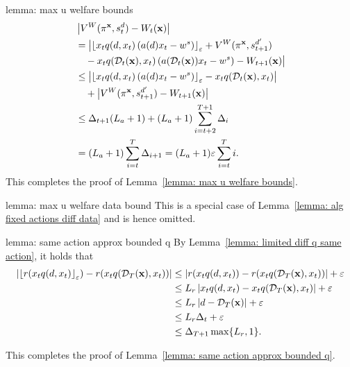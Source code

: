 \begin{proofof}{lemma: max u welfare bounds}
\begin{align*}
&\left| V^W(\pi^{{\bf{x}}}, s_t^d) - W_t({\bf{x}}) \right| \\
&= \big| {\left\lfloor x_t q(d, x_t) \left(a(d) x_t - w^s \right)\right\rfloor_{\varepsilon}} + V^W(\pi^{{\bf{x}}}, s_{t+1}^{d'}) \\
&\quad - x_t q(\mathcal{D}_t({\bf{x}}), x_t) \left( a(\mathcal{D}_t({\bf{x}})) x_t - w^s \right) - W_{t+1}({\bf{x}}) \big| \\
&\leq \big| {\left\lfloor x_t q(d, x_t) \left(a(d) x_t - w^s \right)\right\rfloor_{\varepsilon}} - x_t q(\mathcal{D}_t({\bf{x}}), x_t) \big| \\
&\quad + \big| V^W(\pi^{{\bf{x}}}, s_{t+1}^{d'}) - W_{t+1}({\bf{x}}) \big| \\
&\leq \Delta_{t+1} (L_a+1) + (L_a+1)\sum_{i = t+2}^{T+1} \Delta_i \\
&= (L_a+1) \sum_{i = t}^T \Delta_{i+1} = (L_a+1) \varepsilon \sum_{i = t}^T i.
\end{align*}
This completes the proof of Lemma~\ref{lemma: max u welfare bounds}.
\end{proofof}





\begin{proofof}{lemma: max u welfare data bound}
This is a special case of Lemma~\ref{lemma: alg fixed actions diff data} and is hence omitted.
\end{proofof}


\begin{proofof}{lemma: same action approx bounded q}
By Lemma~\ref{lemma: limited diff q same action}, it holds that
\begin{align*}
\left| {\left\lfloor r(x_t q(d, x_t)\right\rfloor_{\varepsilon}}) - r(x_t q(\mathcal{D}_T({\bf{x}}), x_t)) \right| &\leq \left| r(x_t q(d, x_t)) - r(x_t q(\mathcal{D}_T({\bf{x}}), x_t)) \right| + \varepsilon \\ 
& \leq L_r \left| x_t q(d, x_t) - x_t q(\mathcal{D}_T({\bf{x}}), x_t) \right| + \varepsilon \\
&\leq L_r \left| d - \mathcal{D}_T({\bf{x}}) \right| + \varepsilon \\
&\leq L_r \Delta_t + \varepsilon \\
&\leq \Delta_{T+1} \max \{ L_r, 1 \}.
\end{align*}

This completes the proof of Lemma~\ref{lemma: same action approx bounded q}.
\end{proofof}



